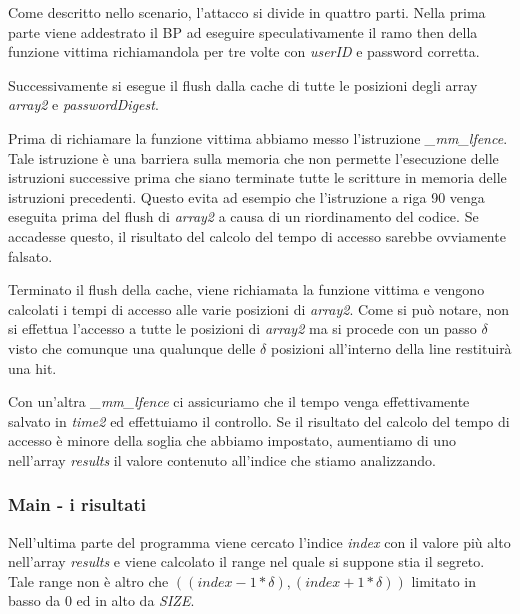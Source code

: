 				Come descritto nello scenario, l'attacco si divide in quattro parti. Nella prima parte viene addestrato il \ac{BP} ad eseguire speculativamente il ramo then della funzione vittima richiamandola per tre volte con \emph{userID} e password corretta.
				
				Successivamente si esegue il flush dalla cache di tutte le posizioni degli array \emph{array2} e \emph{passwordDigest}.
				
				Prima di richiamare la funzione vittima abbiamo messo l'istruzione \emph{\_mm\_lfence}. Tale istruzione è una barriera sulla memoria che non permette l'esecuzione delle istruzioni successive prima che siano terminate tutte le scritture in memoria delle istruzioni precedenti. Questo evita ad esempio che l'istruzione a riga 90 venga eseguita prima del flush di \emph{array2} a causa di un riordinamento del codice. Se accadesse questo, il risultato del calcolo del tempo di accesso sarebbe ovviamente falsato.
				
				Terminato il flush della cache, viene richiamata la funzione vittima e vengono calcolati i tempi di accesso alle varie posizioni di \emph{array2}. Come si può notare, non si effettua l'accesso a tutte le posizioni di \emph{array2} ma si procede con un passo $\delta$ visto che comunque una qualunque delle $\delta$ posizioni all'interno della line restituirà una hit.
				
				Con un'altra \emph{\_mm\_lfence} ci assicuriamo che il tempo venga effettivamente salvato in \emph{time2} ed effettuiamo il controllo. Se il risultato del calcolo del tempo di accesso è minore della soglia che abbiamo impostato, aumentiamo di uno nell'array \emph{results} il valore  contenuto all'indice che stiamo analizzando.
				
				\subsubsection{Main - i risultati}
				
				Nell'ultima parte del programma viene cercato l'indice \emph{index} con il valore più alto nell'array \emph{results} e viene calcolato il range nel quale si suppone stia il segreto. Tale range non è altro che $((index - 1 * \delta),(index + 1 * \delta))$ limitato in basso da $0$ ed in alto da \emph{SIZE}.